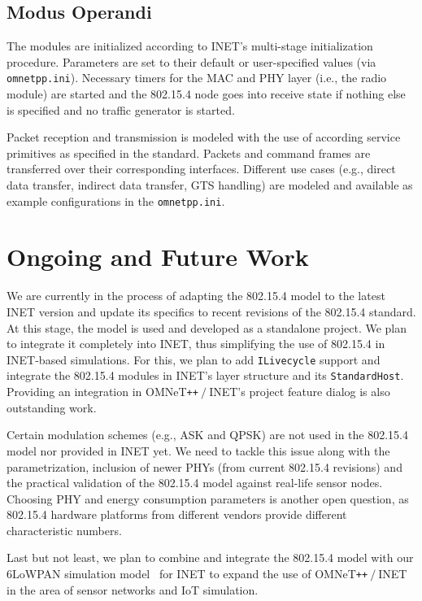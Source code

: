\documentclass[conference,10pt]{IEEEtran}
\newcommand{\omnetinet}{{OMNeT\texttt{++$\:/\:$}INET}\xspace}
\begin{document}
\subsection*{Modus Operandi}
The modules are initialized according to INET's multi-stage initialization procedure.
Parameters are set to their default or user-specified values (via \texttt{omnetpp.ini}).
Necessary timers for the MAC and PHY layer (i.e., the radio module) are started and the 802.15.4 node goes into receive state if nothing else is specified and no traffic generator is started.
\par
Packet reception and transmission is modeled with the use of according service primitives as specified in the standard.
Packets and command frames are transferred over their corresponding interfaces.
Different use cases (e.g., direct data transfer, indirect data transfer, GTS handling) are modeled and available as example configurations in the \texttt{omnetpp.ini}.


\section{Ongoing and Future Work}
\label{sec:ongoing-work}
We are currently in the process of adapting the 802.15.4 model to the latest INET version and update its specifics to recent revisions of the 802.15.4 standard.
At this stage, the model is used and developed as a standalone project. 
We plan to integrate it completely into INET, thus simplifying the use of 802.15.4 in INET-based simulations.
For this, we plan to add \texttt{ILivecycle} support and integrate the 802.15.4 modules in INET's layer structure and its \texttt{StandardHost}.
Providing an integration in \omnetinet's project feature dialog is also outstanding work.
\par
Certain modulation schemes (e.g., ASK and QPSK) are not used in the 802.15.4 model nor provided in INET yet. 
We need to tackle this issue along with the parametrization, inclusion of newer PHYs (from current 802.15.4 revisions) and the practical validation of the 802.15.4 model against real-life sensor nodes.
Choosing PHY and energy consumption parameters is another open question, as 802.15.4 hardware platforms from different vendors provide different characteristic numbers.
\par
Last but not least, we plan to combine and integrate the 802.15.4 model with our 6LoWPAN simulation model~\cite{paper+kirsche-13:6lowpan-omnet} for INET to expand the use of \omnetinet in the area of sensor networks and IoT simulation.
\end{document}
